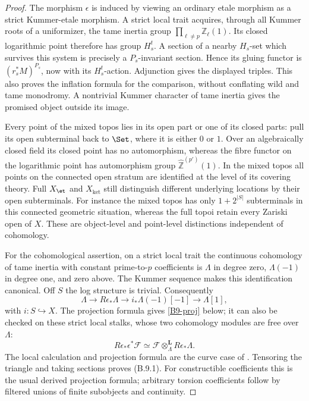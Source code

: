 \begin{proof}
The morphism $\epsilon$ is induced by viewing an ordinary
etale morphism as a strict Kummer-etale morphism. A strict
local trait acquires, through all Kummer roots of a
uniformizer, the tame inertia group
$\prod_{\ell\ne p}\mathbb Z_\ell(1)$. Its closed logarithmic
point therefore has group $H_s^t$. A section of a nearby
$H_s$-set which survives this system is precisely a
$P_s$-invariant section. Hence its gluing functor is
$(r_s^*M)^{P_s}$, now with its $H_s^t$-action. Adjunction gives
the displayed triples. This also proves the inflation formula
for the comparison, without conflating wild and tame
monodromy. A nontrivial Kummer character of tame inertia gives
the promised object outside its image.

Every point of the mixed topos lies in its open part or one
of its closed parts: pull its open subterminal back to
$\Set$, where it is either $0$ or $1$. Over an algebraically
closed field its closed point has no automorphism, whereas
the fibre functor on the logarithmic point has automorphism
group $\widehat{\mathbb Z}^{(p')}(1)$. In the mixed topos all
points on the connected open stratum are identified at the
level of its covering theory. Full $X_{\et}$ and
$X_{\mathrm{ket}}$ still distinguish different underlying
locations by their open subterminals. For instance the mixed
topos has only $1+2^{|S|}$ subterminals in this connected
geometric situation, whereas the full topoi retain every
Zariski open of $X$. These are object-level and point-level
distinctions independent of cohomology.

For the cohomological assertion, on a strict local trait the
continuous cohomology of tame inertia with constant
prime-to-$p$ coefficients is $\Lambda$ in degree zero,
$\Lambda(-1)$ in degree one, and zero above. The Kummer
sequence makes this identification canonical. Off $S$ the
log structure is trivial. Consequently
\[
 \Lambda\longrightarrow R\epsilon_*\Lambda\longrightarrow
 i_*\Lambda(-1)[-1]\longrightarrow\Lambda[1],
\]
with $i:S\hookrightarrow X$. The projection formula gives
\eqref{B9-proj} below; it can also be checked on these strict
local stalks, whose two cohomology modules are free over
$\Lambda$:
\begin{equation}\label{B9-proj}
 R\epsilon_*\epsilon^*\mathcal F
     \simeq\mathcal F\otimes_\Lambda^{\mathbf L}R\epsilon_*\Lambda.
\end{equation}
The local calculation and projection formula are the
curve case of \citet[Theorem~5.2 and \S5.4]{Illusie2002}.
Tensoring the triangle and taking sections proves (B.9.1).
For constructible coefficients this is the usual derived
projection formula; arbitrary torsion coefficients follow
by filtered unions of finite subobjects and continuity.


\end{proof}
